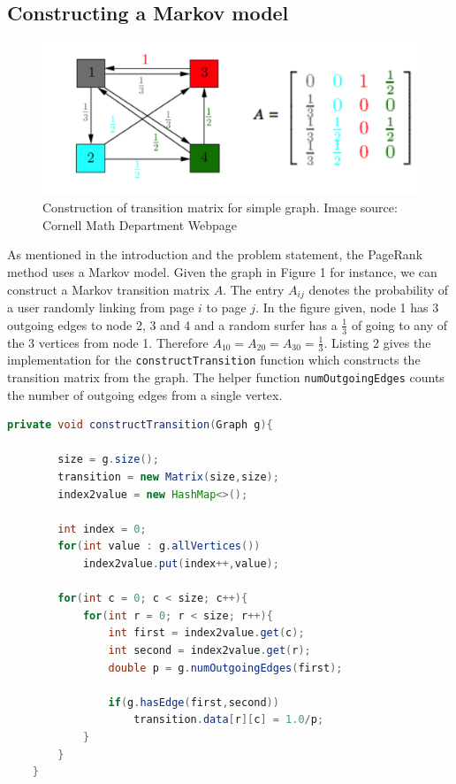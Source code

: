 \documentclass[9.5pt]{extarticle}
\begin{document}
\subsection{Constructing a Markov model}

\begin{figure}[H]
\centering
\includegraphics[scale=0.6]{page_rank_simple.png}
\caption{Construction of transition matrix for simple graph. Image source: Cornell Math Department Webpage}
\label{Figure 1}
\end{figure}

As mentioned in the introduction and the problem statement, the PageRank method uses a Markov model. Given the graph in Figure 1 for instance, we can construct a Markov transition matrix $A$. The entry $A_{ij}$ denotes the probability of a user randomly linking from page $i$ to page $j$. In the figure given, node 1 has 3 outgoing edges to node 2, 3 and 4 and a random surfer has a $\frac{1}{3}$ of going to any of the 3 vertices from node 1. Therefore $A_{10} = A_{20} = A_{30} = \frac{1}{3}$. Listing 2 gives the implementation for the \verb`constructTransition` function which constructs the transition matrix from the graph. The helper function \verb`numOutgoingEdges` counts the number of outgoing edges from a single vertex.


\begin{lstlisting}[language=java,caption={constructTransition}]
	private void constructTransition(Graph g){

        size = g.size();
        transition = new Matrix(size,size);
        index2value = new HashMap<>();

        int index = 0;
        for(int value : g.allVertices())
            index2value.put(index++,value);

        for(int c = 0; c < size; c++){
            for(int r = 0; r < size; r++){
                int first = index2value.get(c);
                int second = index2value.get(r);
                double p = g.numOutgoingEdges(first);

                if(g.hasEdge(first,second))
                    transition.data[r][c] = 1.0/p;
            }
        }
    }
\end{lstlisting}
\end{document}
